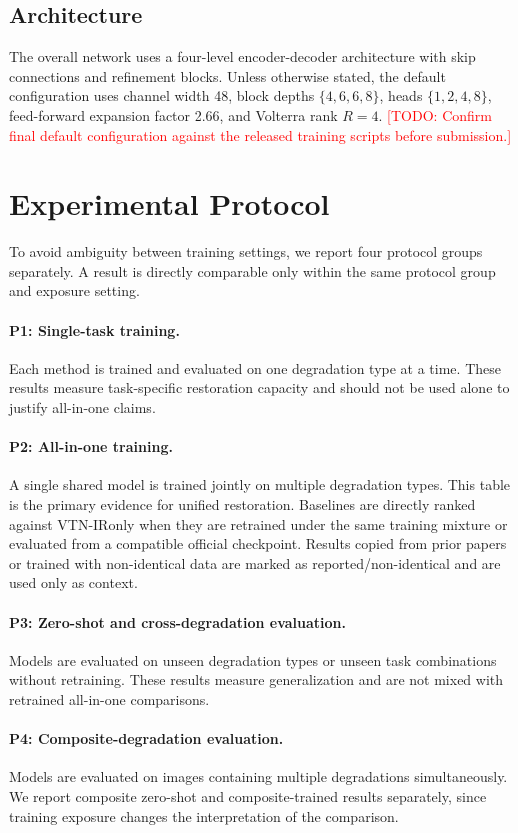 \documentclass[10pt,twocolumn]{article}
\newcommand{\ours}{VTN-IR}
\newcommand{\todo}[1]{\textcolor{red}{[TODO: #1]}}
\begin{document}
\subsection{Architecture}
The overall network uses a four-level encoder-decoder architecture with skip connections and refinement blocks. Unless otherwise stated, the default configuration uses channel width 48, block depths $\{4,6,6,8\}$, heads $\{1,2,4,8\}$, feed-forward expansion factor 2.66, and Volterra rank $R=4$. \todo{Confirm final default configuration against the released training scripts before submission.}

\section{Experimental Protocol}
To avoid ambiguity between training settings, we report four protocol groups separately. A result is directly comparable only within the same protocol group and exposure setting.

\paragraph{P1: Single-task training.}
Each method is trained and evaluated on one degradation type at a time. These results measure task-specific restoration capacity and should not be used alone to justify all-in-one claims.

\paragraph{P2: All-in-one training.}
A single shared model is trained jointly on multiple degradation types. This table is the primary evidence for unified restoration. Baselines are directly ranked against \ours only when they are retrained under the same training mixture or evaluated from a compatible official checkpoint. Results copied from prior papers or trained with non-identical data are marked as reported/non-identical and are used only as context.

\paragraph{P3: Zero-shot and cross-degradation evaluation.}
Models are evaluated on unseen degradation types or unseen task combinations without retraining. These results measure generalization and are not mixed with retrained all-in-one comparisons.

\paragraph{P4: Composite-degradation evaluation.}
Models are evaluated on images containing multiple degradations simultaneously. We report composite zero-shot and composite-trained results separately, since training exposure changes the interpretation of the comparison.
\end{document}
